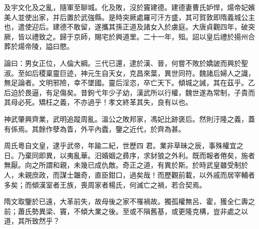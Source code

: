 \begin{pinyinscope}
 及宇文化及之亂，隨軍至聊城。化及敗，沒於竇建德。建德妻曹氏妒悍，煬帝妃嬪美人並使出家，并后置於武強縣。是時突厥處羅可汗方盛，其可賀敦即隋義城公主也，遣使迎后。建德不敢留，遂攜其孫正道及諸女入於虜庭。大唐貞觀四年，破突厥，皆以禮致之。歸于京師，賜宅於興道里。二十一年，殂。詔以皇后禮於揚州合葬於煬帝陵，謚曰愍。



 論曰：男女正位，人倫大綱。三代已還，逮於漢、晉，何嘗不敗於嬌詖而興於聖淑。至如后稷稟靈巨迹，神元生自天女，克昌來葉，異世同符。魏諸后婦人之識，無足論者。文明邪險，幸不墜國。靈后淫恣，卒亡天下。傾城之誡，其在茲乎。乙后迫於畏逼，有足傷矣。昔鉤弋年少子幼，漢武所以行權，魏世遂為常制，子貴而其母必死。矯枉之義，不亦過乎！孝文終革其失，良有以也。



 神武肇興齊業，武明追蹤周亂。溫公之敗邦家，馮妃比跡褒后。然則汙隆之義，蓋有係焉。其餘作孽為眚，外平內蠹，鑒之近代，於齊為甚。



 周氏粵自文皇，逮乎武帝，年踰二紀，世歷四
 君。業非草昧之辰，事殊權宜之日。乃棄同即異，以夷亂華。汨婚姻之彞序，求豺狼之外利。既而報者倦矣，施者無厭。向之所謂和親，未幾已成仇敵。奇正之道，有異於斯。於時武皇雖受制於人，未親庶政，而謀士韞奇，直臣鉗口，過矣哉！而歷觀前載，以外戚而居宰輔者多矣；而傾漢室者王族，喪周家者楊氏，何滅亡之禍，若合契焉。



 隋文取鑒於已遠，大革前失，故母後之家不罹禍故。獨孤權無呂、霍，獲全仁壽之前；蕭氏勢異梁、竇，不傾大業之後。至或不隕舊基，或更隆克構，豈非處之以道，其所致然乎？



\end{pinyinscope}